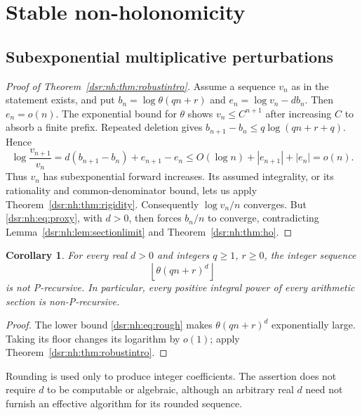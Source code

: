 \documentclass[11pt,a4paper]{article}
\numberwithin{equation}{section}
\newtheorem{corollary}[theorem]{Corollary}
\theoremstyle{definition}
\theoremstyle{remark}
\newcommand{\tht}{\theta}
\theoremstyle{definition}
\theoremstyle{plain}
\begin{document}
\section{Stable non-holonomicity}
\label{dsr:nh:sec:stable}
\subsection{Subexponential multiplicative perturbations}
\begin{proof}[Proof of Theorem~\ref{dsr:nh:thm:robustintro}]
Assume a sequence $v_n$ as in the statement exists, and put
$b_n=\log\tht(qn+r)$ and $e_n=\log v_n-db_n$. Then $e_n=o(n)$.
The exponential bound for $\tht$ shows $v_n\le C^{n+1}$ after increasing
$C$ to absorb a finite prefix. Repeated deletion gives
$b_{n+1}-b_n\le q\log(qn+r+q)$. Hence
\[
\log\frac{v_{n+1}}{v_n}
=d(b_{n+1}-b_n)+e_{n+1}-e_n
\le O(\log n)+|e_{n+1}|+|e_n|=o(n).
\]
Thus $v_n$ has subexponential forward increases. Its assumed integrality,
or its rationality and common-denominator bound, lets us apply
Theorem~\ref{dsr:nh:thm:rigidity}. Consequently $\log v_n/n$ converges.
But \eqref{dsr:nh:eq:proxy}, with $d>0$, then forces $b_n/n$ to converge,
contradicting Lemma~\ref{dsr:nh:lem:sectionlimit} and
Theorem~\ref{dsr:nh:thm:ho}.
\end{proof}

\begin{corollary}
\label{dsr:nh:cor:powers}
For every real $d>0$ and integers $q\ge1$, $r\ge0$, the integer sequence
\[
\left\lfloor\tht(qn+r)^d\right\rfloor
\]
is not P-recursive. In particular, every positive integral power of every
arithmetic section is non-P-recursive.
\end{corollary}
\begin{proof}
The lower bound \eqref{dsr:nh:eq:rough} makes $\tht(qn+r)^d$ exponentially large.
Taking its floor changes its logarithm by $o(1)$; apply
Theorem~\ref{dsr:nh:thm:robustintro}.
\end{proof}
Rounding is used only to produce integer coefficients. The assertion does
not require $d$ to be computable or algebraic, although an arbitrary real
$d$ need not furnish an effective algorithm for its rounded sequence.
\end{document}
